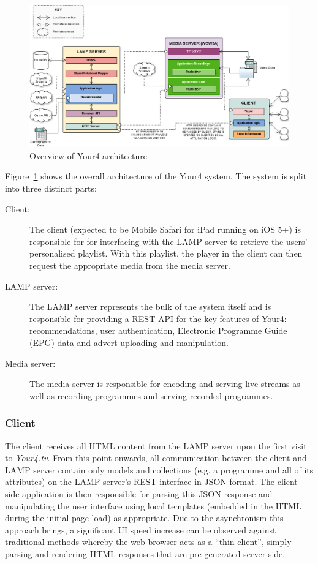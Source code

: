 \begin{figure}[H]
	\centering
	\includegraphics[width=\textwidth]{images/your4-architecture.png}
	\caption{Overview of Your4 architecture}
	\label{fig:your4-architecture}
\end{figure}

Figure~\ref{fig:your4-architecture} shows the overall architecture of the Your4 system. The system is split into three distinct parts:

\begin{description}
	\item[Client:] The client (expected to be Mobile Safari for iPad running on iOS 5+) is responsible for for interfacing with the LAMP server to retrieve the users' personalised playlist. With this playlist, the player in the client can then request the appropriate media from the media server.
	\item[LAMP server:] The LAMP server represents the bulk of the system itself and is responsible for providing a REST API for the key features of Your4: recommendations, user authentication, Electronic Programme Guide (EPG) data and advert uploading and manipulation.
	\item[Media server:] The media server is responsible for encoding and serving live streams as well as recording programmes and serving recorded programmes.
\end{description}

\subsubsection{Client}

The client receives all HTML content from the LAMP server upon the first visit to \textit{Your4.tv}. From this point onwards, all communication between the client and LAMP server contain only models and collections (e.g. a programme and all of its attributes) on the LAMP server's REST interface in JSON format. The client side application is then responsible for parsing this JSON response and manipulating the user interface using local templates (embedded in the HTML during the initial page load) as appropriate. Due to the asynchronism this approach brings, a significant UI speed increase can be observed against traditional methods whereby the web browser acts as a ``thin client'', simply parsing and rendering HTML responses that are pre-generated server side.

